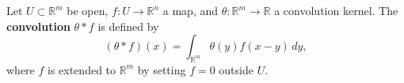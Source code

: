 Let $U \subset \mathbb{R}^m$ be open, $f: U \to \mathbb{R}^n$ a map, and $\theta: \mathbb{R}^m \to \mathbb{R}$ a convolution kernel. The \textbf{convolution} $\theta * f$ is defined by
$$(\theta * f)(x) = \int_{\mathbb{R}^m} \theta(y) f(x - y) \, dy,$$
where $f$ is extended to $\mathbb{R}^m$ by setting $f = 0$ outside $U$.
